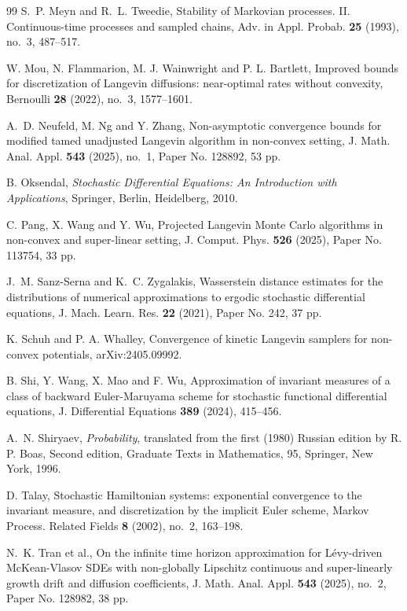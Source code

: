 \documentclass[aap]{imsart}
\theoremstyle{plain}
\theoremstyle{definition}
\begin{document}
\begin{thebibliography}{99}
				\label{Meyn1993} S.~P. Meyn and R.~L. Tweedie, Stability of Markovian processes. II. Continuous-time processes and sampled chains, Adv. in Appl. Probab. {\bf 25} (1993), no.~3, 487--517.
				
				\label{Bernoulli} W. Mou, N. Flammarion, M. J. Wainwright and P. L. Bartlett, Improved bounds for discretization of Langevin diffusions: near-optimal rates without convexity, Bernoulli {\bf 28} (2022), no.~3, 1577--1601.
				
				\label{A.D. N}A.~D. Neufeld, M. Ng and Y. Zhang, Non-asymptotic convergence bounds for modified tamed unadjusted Langevin algorithm in non-convex setting, J. Math. Anal. Appl. {\bf 543} (2025), no.~1, Paper No. 128892, 53 pp.
				
				\label{Ok} B. Oksendal, {\it Stochastic Differential Equations: An Introduction with Applications}, Springer, Berlin, Heidelberg, 2010.
				
				\label{P.C}C. Pang, X. Wang and Y. Wu, Projected Langevin Monte Carlo algorithms in non-convex and super-linear setting, J. Comput. Phys. {\bf 526} (2025), Paper No. 113754, 33 pp.
				
				\label{JLMR} J.~M. Sanz-Serna and K.~C. Zygalakis, Wasserstein distance estimates for the distributions of numerical approximations to ergodic stochastic differential equations, J. Mach. Learn. Res. {\bf 22} (2021), Paper No. 242, 37 pp.
				
				\label{Schuh} K. Schuh and P. A. Whalley, Convergence of kinetic Langevin samplers for non-convex potentials, arXiv:2405.09992.
				
				\label{IM3} B. Shi, Y. Wang, X. Mao and F. Wu, Approximation of invariant measures of a class of backward Euler-Maruyama scheme for stochastic functional differential equations, J. Differential Equations {\bf 389} (2024), 415--456.
				
				\label{Pro} A.~N. Shiryaev, {\it Probability}, translated from the first (1980) Russian edition by R. P. Boas, Second edition, 
				Graduate Texts in Mathematics, 95, Springer, New York, 1996.
				
				\label{Talay} D. Talay, Stochastic Hamiltonian systems: exponential convergence to the invariant measure, and discretization by the implicit Euler scheme, Markov Process. Related Fields {\bf 8} (2002), no.~2, 163--198.
				
				\label{N.K} N.~K. Tran et al., On the infinite time horizon approximation for L\'evy-driven McKean-Vlasov SDEs with non-globally Lipschitz continuous and super-linearly growth drift and diffusion coefficients, J. Math. Anal. Appl. {\bf 543} (2025), no.~2, Paper No. 128982, 38 pp.
				

\end{thebibliography}
\end{document}
